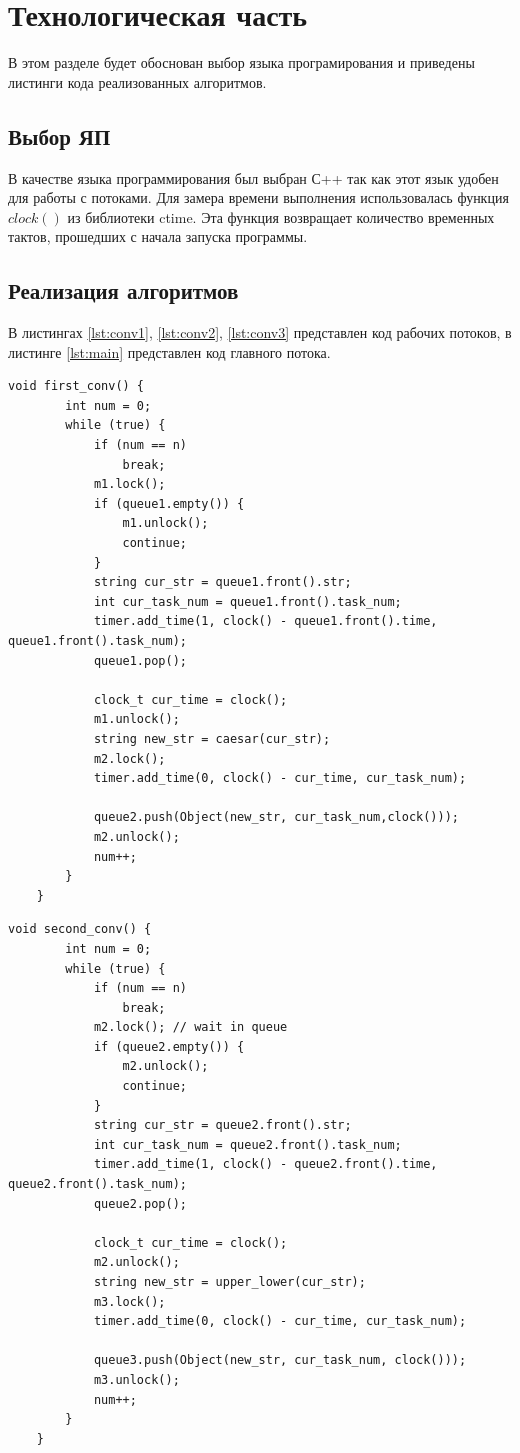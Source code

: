 \documentclass[12pt]{report}
\begin{document}
\chapter{Технологическая часть}

В этом разделе будет обоснован выбор языка програмирования и приведены листинги кода реализованных алгоритмов.

\section{Выбор ЯП}
В качестве языка программирования был выбран С++ так как этот язык удобен для работы с потоками.
Для замера времени выполнения использовалась функция $clock()$ из библиотеки ctime. Эта функция возвращает количество временных тактов, прошедших с начала запуска программы. 

\section{Реализация алгоритмов}

В листингах \ref{lst:conv1}, \ref{lst:conv2}, \ref{lst:conv3} представлен код рабочих потоков, в листинге \ref{lst:main} представлен код главного потока.
\newpage

\begin{lstlisting}[label={lst:conv1},caption=Реализация первого уровня конвейера.]
	void first_conv() {
		int num = 0;
		while (true) {
			if (num == n)
				break;
			m1.lock();
			if (queue1.empty()) {
				m1.unlock();
				continue;
			}
			string cur_str = queue1.front().str;
			int cur_task_num = queue1.front().task_num;
			timer.add_time(1, clock() - queue1.front().time, queue1.front().task_num);
			queue1.pop();
			
			clock_t cur_time = clock();
			m1.unlock();
			string new_str = caesar(cur_str);
			m2.lock();
			timer.add_time(0, clock() - cur_time, cur_task_num);
			
			queue2.push(Object(new_str, cur_task_num,clock()));
			m2.unlock();
			num++;
		}
	}
\end{lstlisting}
\newpage

\begin{lstlisting}[label={lst:conv2},caption=Реализация второго уровня конвейера.]
	void second_conv() {
		int num = 0;
		while (true) {
			if (num == n)
				break;
			m2.lock(); // wait in queue
			if (queue2.empty()) {
				m2.unlock();
				continue;
			}
			string cur_str = queue2.front().str;
			int cur_task_num = queue2.front().task_num;
			timer.add_time(1, clock() - queue2.front().time, queue2.front().task_num);
			queue2.pop();
			
			clock_t cur_time = clock();
			m2.unlock();
			string new_str = upper_lower(cur_str);
			m3.lock();
			timer.add_time(0, clock() - cur_time, cur_task_num);
			
			queue3.push(Object(new_str, cur_task_num, clock()));
			m3.unlock();
			num++;
		}
	}
	
\end{lstlisting}
\newpage
\end{document}

